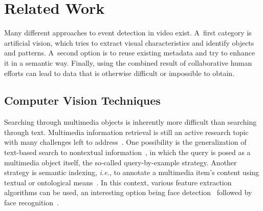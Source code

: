 \documentclass[runningheads,a4paper]{llncs}
\begin{document}
\section{Related Work} \label{sec:related-work}
Many different approaches to event detection in video exist.
A~first category is artificial vision, which tries to extract visual characteristics and identify objects and patterns.
A~second option is to reuse existing metadata and try to enhance it in a semantic way.
Finally, using the combined result of collaborative human efforts can lead to data that is otherwise difficult or impossible to obtain.

\subsection{Computer Vision Techniques}
Searching through multimedia objects is inherently more difficult than searching through text.
Multimedia information retrieval is still an active research topic with many challenges left to address~\cite{Hanjalic:2008}.
One possibility is the generalization of text-based search to nontextual information~\cite{Sivic:2008}, in which the query is posed as a multimedia object itself, the so-called query-by-example strategy.
Another strategy is semantic indexing, \emph{i.e.}, to annotate a multimedia item's content using textual or ontological means~\cite{Hauptmann:2008}.
In this context, various feature extraction algorithms can be used, an interesting option being face detection~\cite{ViolaJones} followed by face recognition~\cite{Verstockt:2009}.
\end{document}
